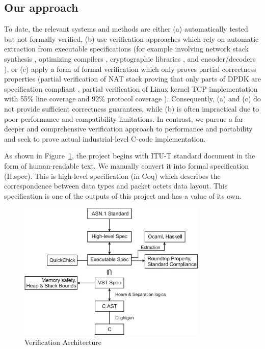 \documentclass[10p,conference]{IEEEtran}
\begin{document}
\subsection{Our approach}
\label{sec:approach}
To date, the relevant systems and methods are either (a) automatically tested but not
formally verified, (b) use verification approaches which rely on
automatic extraction from executable specifications (for example
involving network stack synthesis \cite{VNSSforSel4}, optimizing compilers
\cite{CompCert}, cryptographic libraries \cite{HACL}, and
encoder/decoders \cite{Narcissus}), or (c) apply a form of formal
verification which only proves partial correctness properties (partial
verification of NAT stack proving that only parts of DPDK are specification
compliant \cite{NAT}, partial verification of Linux kernel TCP
implementation with 55\% line coverage and 92\% protocol coverage
\cite{NSDI}). Consequently, (a) and (c) do not provide sufficient
correctness guarantees, while (b) is often impractical due to poor
performance and compatibility limitations. In contrast, we pursue a
far deeper and comprehensive verification approach to performance and
portability and seek to prove actual industrial-level C-code
implementation.

As shown in Figure~\ref{fig:components}, the project begins with ITU-T
standard document in the form of human-readable text. We manually
convert it into formal specification (H.spec). This is high-level
specification (in Coq) which describes the correspondence between data
types and packet octets data layout. This
specification is one of the outputs of this project and has a value of
its own.

\begin{figure}[h!]
  \centering
  \includegraphics[width=9cm]{VerificationArchitectureDiagram.eps}
  \caption{Verification Architecture}
  \label{fig:components}
\end{figure}
\end{document}
